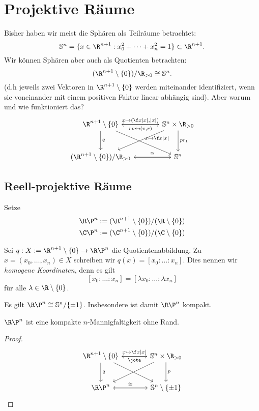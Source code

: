 \section{Projektive Räume}


Bisher haben wir meist die Sphären als Teilräume betrachtet:
\[
	\S^n = \{ x \in \R^{n+1} : x_0^2 + \dotsb + x_n^2 = 1 \} \subset \R^{n+1}.
\]
Wir können Sphären aber auch als Quotienten betrachten:
\[
	(\R^{n+1} \setminus \{0\}) / \R_{>0} \homeomorphic \S^n.
\]
(d.h jeweils zwei Vektoren in $\R^{n+1} \setminus \{0\}$ werden miteinander identifiziert, wenn sie voneinander mit einem positiven Faktor linear abhängig sind).
Aber warum und wie funktioniert das?
\[
	\begin{tikzcd}[column sep=large,row sep=large]
		\R^{n+1} \setminus \{0\} \arrow{r}{x \mapsto (\f x{|x|}, |x|)} \arrow{d}{q} \arrow{dr}{x \mapsto \f x{|x|}} &
		\S^n \times \R_{>0} \arrow{l}{rv \mapsfrom (v,r)} \arrow{dl} \arrow{d}{pr_1} \\
		(\R^{n+1} \setminus \{0\}) / \R_{>0} \arrow{r}{\homeomorphic} &
		\S^n \arrow{l}{}
	\end{tikzcd}
\]

\subsection{Reell-projektive Räume}

Setze
\begin{align*}
	\R\P^n &:= (\R^{n+1} \setminus \{0\}) / (\R \setminus \{0\}) \\
	\C\P^n &:= (\C^{n+1} \setminus \{0\}) / (\C \setminus \{0\})
\end{align*}

Sei $q: X := \R^{n+1} \setminus \{0\} \to \R\P^n$ die Quotientenabbildung.
Zu $x = (x_0, \dotsc, x_n) \in X$ schreiben wir $q(x) = [x_0 : \dotsc : x_n]$.
Dies nennen wir \emph{homogene Koordinaten}, denn es gilt
\[
	[x_0 : \dotsc : x_n ] = [\lambda x_0 : \dotsc : \lambda x_n]
\]
für alle $\lambda \in \R \setminus \{0\}$.

\begin{nt}
	Es gilt $\R\P^n \homeomorphic \S^n / \{\pm 1\}$.
	Insbesondere ist damit $\R\P^n$ kompakt.

	$\R\P^n$ ist eine kompakte $n$-Mannigfaltigkeit ohne Rand.
	\begin{proof}
		\[
			\begin{tikzcd}[column sep=large,row sep=large]
				\R^{n+1} \setminus \{0\} \arrow{r}{x\mapsto \f x{|x|}} \arrow{d}{q} \arrow{dr}{} &
				\S^n \times \R_{>0} \arrow{l}{\jota} \arrow{dl} \arrow{d}{p} \\
				\R\P^n \arrow{r}{\homeomorphic} &
				\S^n \setminus \{\pm 1\} \arrow{l}
			\end{tikzcd}
		\]
	\end{proof}
\end{nt}


